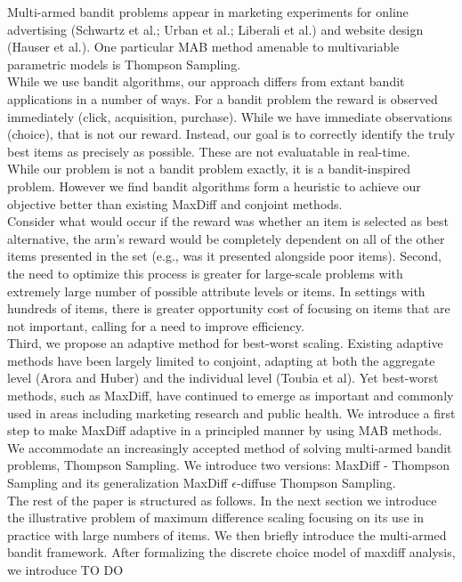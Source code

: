 \documentclass[mksc,blindrev]{informs3} %
\begin{document}
Multi-armed bandit problems appear in marketing experiments for online advertising (Schwartz et al.; Urban et al.; Liberali et al.) and website design (Hauser et al.). One particular MAB method amenable to multivariable parametric models is Thompson Sampling.\\
While we use bandit algorithms, our approach differs from extant bandit applications in a number of ways. For a bandit problem the reward is observed immediately (click, acquisition, purchase). While we have immediate observations (choice), that is not our reward. Instead, our goal is to correctly identify the truly best items as precisely as possible. These are not evaluatable in real-time. \\
While our problem is not a bandit problem exactly, it is a bandit-inspired problem. However we find bandit algorithms form a heuristic to achieve our objective better than existing MaxDiff and conjoint methods. \\
Consider what would occur if the reward was whether an item is selected as best alternative, the arm’s reward would be completely dependent on all of the other items presented in the set (e.g., was it presented alongside poor items). 
Second, the need to optimize this process is greater for large-scale problems with extremely large number of possible attribute levels or items.  In settings with hundreds of items, there is greater opportunity cost of focusing on items that are not important, calling for a need to improve efficiency.\\
Third, we propose an adaptive method for best-worst scaling. Existing adaptive methods have been largely limited to conjoint, adapting at both the aggregate level (Arora and Huber) and the individual level (Toubia et al). Yet best-worst methods, such as MaxDiff, have continued to emerge as important and commonly used in areas including marketing research and public health. We introduce a first step to make MaxDiff adaptive in a principled manner by using MAB methods. We accommodate an increasingly accepted method of solving multi-armed bandit problems, Thompson Sampling. We introduce two versions: MaxDiff - Thompson Sampling and its generalization MaxDiff $\epsilon$-diffuse Thompson Sampling.\\
The rest of the paper is structured as follows. In the next section we introduce the illustrative problem of maximum difference scaling focusing on its use in practice with large numbers of items. We then briefly introduce the multi-armed bandit framework. After formalizing the discrete choice model of maxdiff analysis, we introduce TO DO\\
\end{document}
